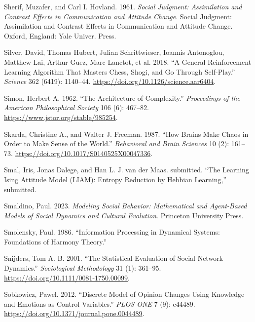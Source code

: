 \documentclass[
  a4paper,
  DIV=11,
  numbers=noendperiod,
  oneside]{scrreprt}
\newlength{\cslhangindent}
\newenvironment{CSLReferences}[2] %
 {\begin{list}{}{%
  \setlength{\itemindent}{0pt}
  \setlength{\leftmargin}{0pt}
  \setlength{\parsep}{0pt}
  \ifodd #1
   \setlength{\leftmargin}{\cslhangindent}
   \setlength{\itemindent}{-1\cslhangindent}
  \fi
  \setlength{\itemsep}{#2\baselineskip}}}
 {\end{list}}
\begin{document}
\begin{CSLReferences}{1}{0}
Sherif, Muzafer, and Carl I. Hovland. 1961. \emph{Social Judgment:
{Assimilation} and Contrast Effects in Communication and Attitude
Change}. Social Judgment: {Assimilation} and Contrast Effects in
Communication and Attitude Change. {Oxford, England}: {Yale Univer.
Press}.

Silver, David, Thomas Hubert, Julian Schrittwieser, Ioannis Antonoglou,
Matthew Lai, Arthur Guez, Marc Lanctot, et al. 2018. {``A General
Reinforcement Learning Algorithm That Masters Chess, Shogi, and {Go}
Through Self-Play.''} \emph{Science} 362 (6419): 1140--44.
\url{https://doi.org/10.1126/science.aar6404}.

Simon, Herbert A. 1962. {``The Architecture of Complexity.''}
\emph{Proceedings of the American Philosophical Society} 106 (6):
467--82. \url{https://www.jstor.org/stable/985254}.

Skarda, Christine A., and Walter J. Freeman. 1987. {``How Brains Make
Chaos in Order to Make Sense of the World.''} \emph{Behavioral and Brain
Sciences} 10 (2): 161--73.
\url{https://doi.org/10.1017/S0140525X00047336}.

Smal, Iris, Jonas Dalege, and Han L. J. van der Maas. submitted. {``The
{Learning Ising Attitude Model} ({LIAM}): {Entropy Reduction} by
{Hebbian Learning},''} submitted.

Smaldino, Paul. 2023. \emph{Modeling Social Behavior: Mathematical and
Agent-Based Models of Social Dynamics and Cultural Evolution}. Princeton
University Press.

Smolensky, Paul. 1986. {``Information {Processing} in {Dynamical
Systems}: {Foundations} of {Harmony Theory}.''}

Snijders, Tom A. B. 2001. {``The {Statistical Evaluation} of {Social
Network Dynamics}.''} \emph{Sociological Methodology} 31 (1): 361--95.
\url{https://doi.org/10.1111/0081-1750.00099}.

Sobkowicz, Pawel. 2012. {``Discrete {Model} of {Opinion Changes Using
Knowledge} and {Emotions} as {Control Variables}.''} \emph{PLOS ONE} 7
(9): e44489. \url{https://doi.org/10.1371/journal.pone.0044489}.


\end{CSLReferences}
\end{document}
